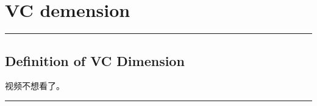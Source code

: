 \section{VC demension}
\noindent
{\color{RubineRed} \rule{\linewidth}{1mm} }

\subsection{Definition of VC Dimension} %
\label{sub:definition_of_vc_dimension}
视频不想看了。 
\noindent
{\color{LightRubineRed} \rule{\linewidth}{1mm} }